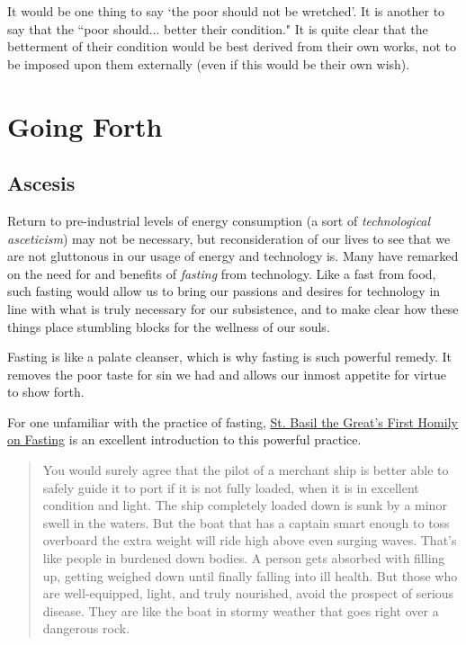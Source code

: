 \documentclass[letterpaper]{article}
\begin{document}
It would be one thing to say `the poor should not be wretched'. It is another to say that the ``poor should... better their condition."  It is quite clear that the betterment of their condition would be best derived from their own works, not to be imposed upon them externally (even if this would be their own wish).




\section{Going Forth}




\iffalse
\subsection{Ascesis}

Return to pre-industrial levels of energy consumption (a sort of \textit{technological asceticism}) may not be necessary, but reconsideration of our lives to see that we are not gluttonous in our usage of energy and technology is. Many have remarked on the need for and benefits of \textit{fasting} from technology. Like a fast from food, such fasting would allow us to bring our passions and desires for technology in line with what is truly necessary for our subsistence, and to make clear how these things place stumbling blocks for the wellness of our souls. 

Fasting is like a palate cleanser, which is why fasting is such powerful remedy. It removes the poor taste for sin we had and allows our inmost appetite for virtue to show forth.

For one unfamiliar with the practice of fasting, \href{http://rutgersnb.occministries.org/wp-content/uploads/2015/07/St.-Basil-the-Great%E2%80%99s-First-Homily-on-Fasting.pdf}{St. Basil the Great's First Homily on Fasting} is an excellent introduction to this powerful practice. 

\begin{quote}
  You would surely agree that the pilot of a merchant ship is better able to safely guide it to port if it is not fully loaded, when it is in excellent condition and light. The ship completely loaded down is sunk by a minor swell in the waters. But the boat that has a captain smart enough to toss overboard the extra weight will ride high above even surging waves.
  That’s like people in burdened down bodies. A person gets absorbed with filling up, getting weighed down until finally falling into ill health. But those who are well-equipped, light, and truly nourished, avoid the prospect of serious disease. They are like the boat in stormy weather that goes right over a dangerous rock.
\end{quote}
\end{document}
